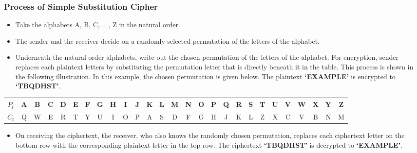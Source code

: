 \documentclass[british]{report}
\providecommand{\tabularnewline}{\\}
\begin{document}
\subsubsection{Process of Simple Substitution Cipher}
\begin{itemize}
	\item Take the alphabets A, B, C,$\:\ldots\:$, Z in the natural order.
	\item The sender and the receiver decide on a randomly selected permutation
	      of the letters of the alphabet.
	\item Underneath the natural order alphabets, write out the chosen permutation
	      of the letters of the alphabet. For encryption, sender replaces each
	      plaintext letters by substituting the permutation letter that is directly
	      beneath it in the table. This process is shown in the following illustration.
	      In this example, the chosen permutation is given below. The plaintext
	      \textbf{`EXAMPLE'} is encrypted to \textbf{`TBQDHST'}.
\end{itemize}
\begin{center}
	{\scriptsize{}}%
	\begin{tabular}{|c|c|c|c|c|c|c|c|c|c|c|c|c|c|c|c|c|c|c|c|c|c|c|c|c|c|c|}
		\hline
		{\scriptsize{}$P_{t}$} & {\scriptsize{}A} & {\scriptsize{}B} & {\scriptsize{}C} & {\scriptsize{}D} & {\scriptsize{}E} & {\scriptsize{}F} & {\scriptsize{}G} & {\scriptsize{}H} & {\scriptsize{}I} & {\scriptsize{}J} & {\scriptsize{}K} & {\scriptsize{}L} & {\scriptsize{}M} & {\scriptsize{}N} & {\scriptsize{}O} & {\scriptsize{}P} & {\scriptsize{}Q} & {\scriptsize{}R} & {\scriptsize{}S} & {\scriptsize{}T} & {\scriptsize{}U} & {\scriptsize{}V} & {\scriptsize{}W} & {\scriptsize{}X} & {\scriptsize{}Y} & {\scriptsize{}Z}\tabularnewline
		\hline
		\hline
		{\scriptsize{}$C_{t}$} & {\scriptsize{}Q} & {\scriptsize{}W} & {\scriptsize{}E} & {\scriptsize{}R} & {\scriptsize{}T} & {\scriptsize{}Y} & {\scriptsize{}U} & {\scriptsize{}I} & {\scriptsize{}O} & {\scriptsize{}P} & {\scriptsize{}A} & {\scriptsize{}S} & {\scriptsize{}D} & {\scriptsize{}F} & {\scriptsize{}G} & {\scriptsize{}H} & {\scriptsize{}J} & {\scriptsize{}K} & {\scriptsize{}L} & {\scriptsize{}Z} & {\scriptsize{}X} & {\scriptsize{}C} & {\scriptsize{}V} & {\scriptsize{}B} & {\scriptsize{}N} & {\scriptsize{}M}\tabularnewline
		\hline
	\end{tabular}{\scriptsize\par}
	\par\end{center}
\begin{itemize}
	\item On receiving the ciphertext, the receiver, who also knows the randomly
	      chosen permutation, replaces each ciphertext letter on the bottom
	      row with the corresponding plaintext letter in the top row. The ciphertext
	      \textbf{`TBQDHST'} is decrypted to \textbf{`EXAMPLE'}.
\end{itemize}
\end{document}
